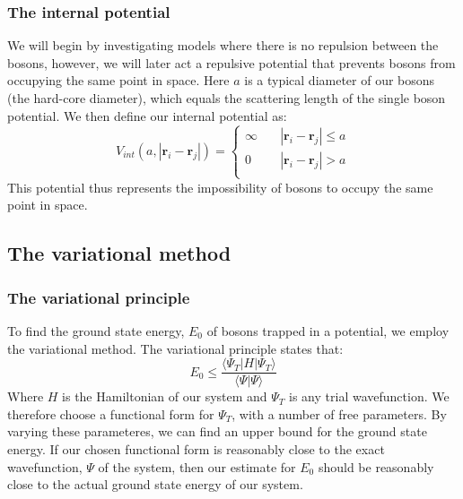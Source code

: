 \documentclass[a4paper, 10pt]{article}
\begin{document}
\subsubsection{The internal potential}
We will begin by investigating models where there is no repulsion between the bosons, however, we will later act a repulsive potential that prevents bosons from occupying the same point in space. Here $a$ is a typical diameter of our bosons (the hard-core diameter), which equals the scattering length of the single boson potential. We then define our internal potential as:
\begin{equation}
V_{int}(a,|\boldsymbol{r}_i-\boldsymbol{r}_j|)= 
     \begin{cases}
       \infty & \quad |\boldsymbol{r}_i-\boldsymbol{r}_j| \leq  a\\
       0 & \quad |\boldsymbol{r}_i-\boldsymbol{r}_j|>  a\\
     \end{cases}
\end{equation}
This potential thus represents the impossibility of bosons to occupy the same point in space.
\subsection{The variational method}
\subsubsection{The variational principle}
To find the ground state energy, $E_0$ of bosons trapped in a potential, we employ the variational method. The variational principle states that:
\begin{equation}\label{eq:Variational_principle}
E_0\leq  \frac{\langle \Psi_T |H|\Psi_T \rangle}{\langle \Psi|\Psi\rangle}
\end{equation}
Where $H$ is the Hamiltonian of our system and $\Psi_T$ is any trial wavefunction. We therefore choose a functional form for $\Psi_T$, with a number of free parameters. By varying these parameteres, we can find an upper bound for the ground state energy. If our chosen functional form is reasonably close to the exact wavefunction, $\Psi$ of the system, then our estimate for $E_0$ should be reasonably close to the actual ground state energy of our system.
\end{document}
